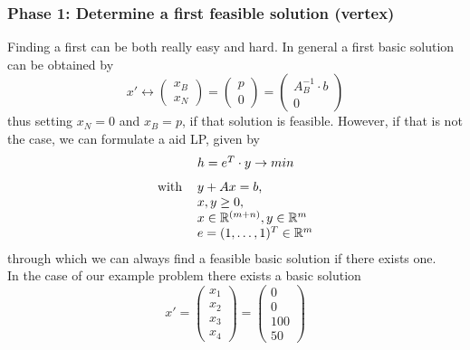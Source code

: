 \documentclass[a4paper, 11pt]{article}
\begin{document}
\subsubsection{Phase 1: Determine a first feasible solution (vertex)}
Finding a first can be both really easy and hard. In general a first basic solution can be obtained by 
\begin{equation*}
	x' \longleftrightarrow 
	\left( \begin{array}{c}
		x_B \\ x_N
	\end{array}\right) = \left(\begin{array}{c}
		p \\ 0
	\end{array}\right) = \left(\begin{array}{c}
		A_B^{-1}\cdot b \\ 0
	\end{array}\right)
\end{equation*}
thus setting $x_N=0$ and $x_B=p$, if that solution is feasible. However, if that is not the case, we can formulate a aid LP, given by
\begin{equation}
	\label{hilfsproblem}
	\begin{tabular}{cl}
		&$h = e^T\cdot y \rightarrow min$\vspace{0.25cm}\\
		with&$y+Ax = b$,\\
		&$x, y\geq 0,$\\
		&$x\in \mathbb{R}^{(m+n)}, y\in\mathbb{R}^m$\\
		&$e= (1,\dots,1)^T\in\mathbb{R}^m$
	\end{tabular}
\end{equation}
through which we can always find a feasible basic solution if there exists one.\\
In the case of our example problem there exists a basic solution 
\begin{equation*}
	x' = \left(\begin{array}{c}
		x_1\\x_2\\x_3\\x_4
	\end{array}\right) = \left(\begin{array}{c}
		0\\0\\100\\50
	\end{array}\right)
\end{equation*}
\end{document}
